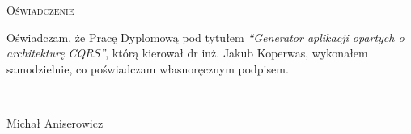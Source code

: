 \newpage
\thispagestyle{empty}


\begin{center}
 \LARGE\textsc{Oświadczenie}
\end{center}

\vspace{1cm}

Oświadczam, że Pracę Dyplomową pod tytułem \emph{``Generator aplikacji opartych o architekturę CQRS''}, którą kierował dr inż. Jakub Koperwas, wykonałem samodzielnie, co poświadczam własnoręcznym podpisem.

\vspace{2cm}

\begin{flushright}
\begin{minipage}{5cm}
 \dotfill \\[-0.7cm]
 \begin{center}
  \small Michał Aniserowicz
 \end{center}
\end{minipage}
\end{flushright}


